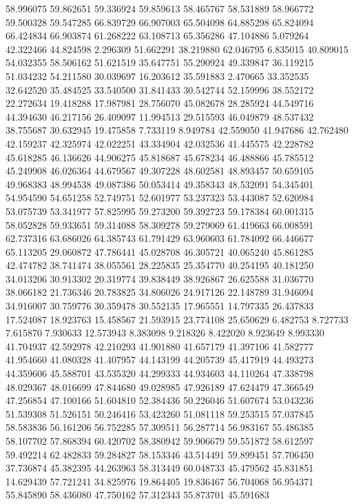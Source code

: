 58.996075
59.862651
59.336924
59.859613
58.465767
58.531889
58.966772
59.500328
59.547285
66.839729
66.907003
65.504098
64.885298
65.824094
66.424834
66.903874
61.268222
63.108713
65.356286
47.104886
5.079264
42.322466
44.824598
2.296309
51.662291
38.219880
62.046795
6.835015
40.809015
54.032355
58.506162
51.621519
35.647751
55.290924
49.339847
36.119215
51.034232
54.211580
30.039697
16.203612
35.591883
2.470665
33.352535
32.642520
35.484525
33.540500
31.841433
30.542744
52.159996
38.552172
22.272634
19.418288
17.987981
28.756070
45.082678
28.285924
44.549716
44.394630
46.217156
26.409097
11.994513
29.515593
46.049879
48.537432
38.755687
30.632945
19.475858
7.733119
8.949784
42.559050
41.947686
42.762480
42.159237
42.325974
42.022251
43.334904
42.032536
41.445575
42.228782
45.618285
46.136626
44.906275
45.818687
45.678234
46.488866
45.785512
45.249908
46.026364
44.679567
49.307228
48.602581
48.893457
50.659105
49.968383
48.994538
49.087386
50.053414
49.358343
48.532091
54.345401
54.954590
54.651258
52.749751
52.601977
53.237323
53.443087
52.620984
53.075739
53.341977
57.825995
59.273200
59.392723
59.178384
60.001315
58.052828
59.933651
59.314088
58.309278
59.279069
61.419663
66.008591
62.737316
63.686026
64.385743
61.791429
63.960603
61.784092
66.446677
65.113205
29.060872
47.786441
45.028708
46.305721
40.065240
45.861285
42.474782
38.741474
38.055561
28.225835
25.354770
40.254195
40.181250
34.013206
30.913302
20.319774
39.838449
38.926867
26.625588
31.036770
38.066182
21.736346
20.783825
34.806026
24.917126
22.148789
31.946094
34.916007
30.759776
30.359478
30.552135
17.965551
14.797335
26.437833
17.524087
18.923763
15.458567
21.593915
23.774108
25.650629
6.482753
8.727733
7.615870
7.930633
12.573943
8.383098
9.218326
8.422020
8.923649
8.993330
41.704937
42.592978
42.210293
41.901880
41.657179
41.397106
41.582777
41.954660
41.080328
41.407957
44.143199
44.205739
45.417919
44.493273
44.359606
45.588701
43.535320
44.299333
44.934603
44.110264
47.338798
48.029367
48.016699
47.844680
49.028985
47.926189
47.624479
47.366549
47.256854
47.100166
51.604810
52.384436
50.226046
51.607674
53.043236
51.539308
51.526151
50.246416
53.423260
51.081118
59.253515
57.037845
58.583836
56.161206
56.752285
57.309511
56.287714
56.983167
55.486385
58.107702
57.868394
60.420702
58.380942
59.906679
59.551872
58.612597
59.492214
62.482833
59.284827
58.153346
43.514491
59.899451
57.706450
37.736874
45.382395
44.263963
58.313449
60.048733
45.479562
45.831851
14.629439
57.721241
34.825976
19.864405
19.836467
56.704068
56.954371
55.845890
58.436080
47.750162
57.312343
55.873701
45.591683
